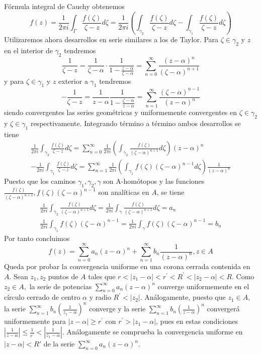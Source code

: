 \documentclass[a4paper, 11pt]{extarticle}
\begin{document}
\begin{multicols*}{2}
{Fórmula integral de Cauchy obtenemos
$$
f(z) =\frac{1}{2 \pi i} \int_{\Gamma} \frac{f(\zeta)}{\zeta-z} d \zeta 
=\frac{1}{2 \pi i} \left( \int_{\gamma_{2}} \frac{f(\zeta)}{\zeta-z} d \zeta- \int_{\gamma_{1}} \frac{f(\zeta)}{\zeta-z} d \zeta \right)
$$
Utilizaremos ahora desarrollos en serie similares a los de Taylor. 
Para $\zeta \in \gamma_{2}$ y $z$ en el interior de $\gamma_{2}$ tendremos
$$
\frac{1}{\zeta-z}=\frac{1}{\zeta-\alpha} \cdot \frac{1}{1-\frac{z-\alpha}{\zeta-\alpha}}=\sum_{n=0}^{\infty} \frac{(z-\alpha)^{n}}{(\zeta-\alpha)^{n+1}}
$$
y para $\zeta \in \gamma_{1}$ y $z$ exterior a $\gamma_{1}$ tendremos
$$
-\frac{1}{\zeta-z}=\frac{1}{z-\alpha} \frac{1}{1-\frac{\zeta-\alpha}{z-\alpha}}=\sum_{n=1}^{\infty} \frac{(\zeta-\alpha)^{n-1}}{(z-\alpha)^{n}}
$$
siendo convergentes las series geométricas y 
uniformemente convergentes en $\zeta \in \gamma_{2}$ y $\zeta \in \gamma_{1}$ respectivamente.
Integrando término a término ambos desarrollos se tiene
$$
\begin{array}{c}
\frac{1}{2 \pi i} \int_{\gamma_{2}} \frac{f(\zeta)}{\zeta-z} d \zeta=\sum_{n=0}^{\infty} \frac{1}{2 \pi i}\left(\int_{\gamma_{2}} 
\frac{f(\zeta)}{(\zeta-\alpha)^{n+1}} d \zeta\right)(z-\alpha)^{n} \\
-\frac{1}{2 \pi i} \int_{\gamma_{1}} \frac{f(\zeta)}{\zeta-z} d \zeta=\sum_{n=1}^{\infty} \frac{1}{2 \pi i}\left(\int_{\gamma_{1}}
 f(\zeta)(\zeta-\alpha)^{n-1} d \zeta\right) \frac{1}{(z-\alpha)^{n}}
\end{array}
$$
Puesto que los caminos $\gamma_{1}, \gamma_{2}, \gamma$ son A-homótopos y las funciones
$\frac{f(\zeta)}{(\zeta-\alpha)^{n+1}}, f(\zeta)(\zeta-\alpha)^{n-1}$
son analíticas en $A$, se tiene
$$
\begin{array}{c}
\frac{1}{2 \pi i} \int_{\gamma_{2}} \frac{f(\zeta)}{(\zeta-\alpha)^{n+1}} d \zeta=\frac{1}{2 \pi i} \int_{\gamma} \frac{f(\zeta)}{(\zeta-\alpha)^{n+1}} d \zeta=a_{n} \\
\frac{1}{2 \pi i} \int_{\gamma_{1}} f(\zeta)(\zeta-\alpha)^{n-1}=\frac{1}{2 \pi i} \int_{\gamma} f(\zeta)(\zeta-\alpha)^{n-1}=b_{n}
\end{array}
$$
Por tanto concluimos
$$
f(z)=\sum_{n=0}^{\infty} a_{n}(z-\alpha)^{n}+\sum_{n=1}^{\infty} b_{n} \frac{1}{(z-\alpha)^{n}}, z \in A
$$
Queda por probar la convergencia uniforme en una corona cerrada contenida en $A$.
Sean $z_{1}, z_{2}$ puntos de $A$ tales que
$r<\left|z_{1}-\alpha\right|<r^{\prime}<R^{\prime}<\left|z_{2}-\alpha\right|<R$.
Como $z_{2} \in A,$ la serie de potencias
$\sum_{n=0}^{\infty} a_{n}(z-\alpha)^{n}$
converge uniformemente en el círculo cerrado de centro $\alpha$ 
y radio $R^{\prime}<\left|z_{2}\right|$. Análogamente, puesto que $z_{1} \in A$, la serie
$\sum_{n=1}^{\infty} b_{n}\left(\frac{1}{z_{1}-\alpha}\right)^{n}$
converge y la serie
$\sum_{n=1}^{\infty} b_{n}\left(\frac{1}{z-\alpha}\right)^{n}$
convergerá uniformemente para $|z-\alpha| \geq r^{\prime}$ con $r^{\prime}>\left|z_{1}-\alpha\right|$, pues en estas
condiciones
$\left|\frac{1}{z-\alpha}\right| \leq \frac{1}{r^{\prime}}<\left|\frac{1}{z_{1}-\alpha}\right|$. 
Análogamente se comprueba la convergencia uniforme en \( |z-\alpha| < R' \) de 
la serie \( \sum _{n=0}^{\infty}a_n(z-\alpha)^n \).}
\end{multicols*}
\pagebreak
\end{document}
